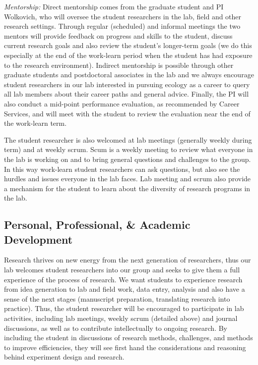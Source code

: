 \documentclass[11pt, oneside]{article}   	%
\begin{document}
\noindent \emph{Mentorship:}
Direct mentorship comes from the graduate student and PI Wolkovich, who will oversee the student researchers in the lab, field and other research settings. Through regular (scheduled) and informal meetings the two mentors will provide feedback on progress and skills to the student, discuss current research goals and also review the student's longer-term goals (we do this especially at the end of the work-learn period when the student has had exposure to the research environment). Indirect mentorship is possible through other graduate students and postdoctoral associates in the lab and we always encourage student researchers in our lab interested in pursuing ecology as a career to query all lab members about their career paths and general advice. Finally, the PI will also conduct a mid-point performance evaluation, as recommended by Career Services, and will meet with the student to review the evaluation near the end of the work-learn term.

The student researcher is also welcomed at lab meetings (generally weekly during term) and at weekly scrum. Scum is a weekly meeting to review what everyone in the lab is working on and to bring general questions and challenges to the group. In this way work-learn student researchers can ask questions, but also see the hurdles and issues everyone in the lab faces. Lab meeting and scrum also provide a mechanism for the student to learn about the diversity of research programs in the lab. 


\subsection{Personal, Professional, \& Academic Development} 
Research thrives on new energy from the next generation of researchers, thus our lab welcomes student researchers into our group and seeks to give them a full experience of the process of research. We want students to experience research from idea generation to lab and field work, data entry, analysis and also have a sense of the next stages (manuscript preparation, translating research into practice). Thus, the student researcher will be encouraged to participate in lab activities, including lab meetings, weekly scrum (detailed above) and journal discussions, as well as to contribute intellectually to ongoing research. By including the student in discussions of research methods, challenges, and methods to improve efficiencies, they will see first hand the considerations and reasoning behind experiment design and research. 
\end{document}
